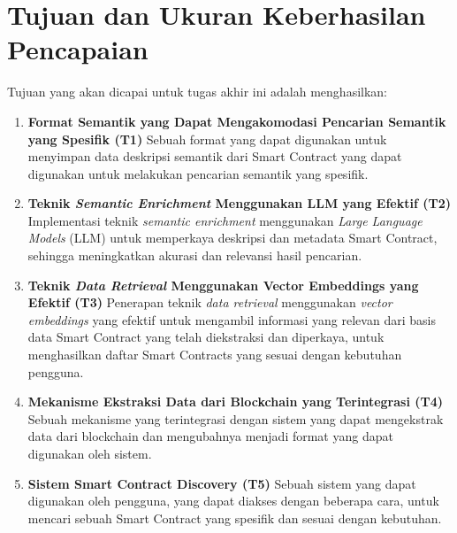 \section{Tujuan dan Ukuran Keberhasilan Pencapaian}
\label{sec:tujuan-ukuran-keberhasilan-pencapaian}


Tujuan yang akan dicapai untuk tugas akhir ini adalah menghasilkan:

\begin{enumerate}
	\item \textbf{Format Semantik yang Dapat Mengakomodasi Pencarian Semantik yang Spesifik (T1)} \newline
	      Sebuah format yang dapat digunakan untuk menyimpan data deskripsi semantik dari Smart Contract yang dapat digunakan untuk melakukan pencarian semantik yang spesifik.

	\item \textbf{Teknik \textit{Semantic Enrichment} Menggunakan LLM yang Efektif (T2)} \newline
	      Implementasi teknik \textit{semantic enrichment} menggunakan \textit{Large Language Models} (LLM) untuk memperkaya deskripsi dan metadata Smart Contract, sehingga meningkatkan akurasi dan relevansi hasil pencarian.

	\item \textbf{Teknik \textit{Data Retrieval} Menggunakan Vector Embeddings yang Efektif (T3)} \newline
	      Penerapan teknik \textit{data retrieval} menggunakan \textit{vector embeddings} yang efektif untuk mengambil informasi yang relevan dari basis data Smart Contract yang telah diekstraksi dan diperkaya, untuk menghasilkan daftar Smart Contracts yang sesuai dengan kebutuhan pengguna.

	\item \textbf{Mekanisme Ekstraksi Data dari Blockchain yang Terintegrasi (T4)} \newline
	      Sebuah mekanisme yang terintegrasi dengan sistem yang dapat mengekstrak data dari blockchain dan mengubahnya menjadi format yang dapat digunakan oleh sistem.

	\item \textbf{Sistem Smart Contract Discovery (T5)} \newline
	      Sebuah sistem yang dapat digunakan oleh pengguna, yang dapat diakses dengan beberapa cara, untuk mencari sebuah Smart Contract yang spesifik dan sesuai dengan kebutuhan.

\end{enumerate}

